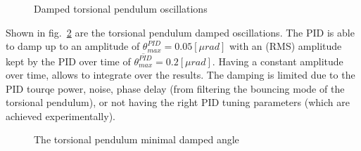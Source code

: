 \documentclass[\main/master.tex]{subfiles}
\begin{document}
\begin{figure}[htbp]
	\centering
	\caption[Damped torsional pendulum oscillations]{Damped torsional pendulum oscillations}
	\label{fig:measured oscillation angle}
\end{figure}
\FloatBarrier
\par\noindent
Shown in fig.~\ref{fig:measured oscillation angle 1} are the torsional pendulum damped oscillations. The PID is able to damp up to an amplitude of $\theta_{max}^{PID}= 0.05[\mu rad]$ with an (RMS) amplitude kept by the PID over time of $\overline{\theta_{max}^{PID}} = 0.2 [\mu rad]$. Having a constant amplitude over time, allows to integrate over the results. The damping is limited due to the PID tourqe power, noise, phase delay (from filtering the bouncing mode of the torsional pendulum), or not having the right PID tuning parameters (which are achieved experimentally).
\begin{figure}[htbp]
	\centering
	\caption[The torsional pendulum minimal damped angle]{The torsional pendulum minimal damped angle}
	\label{fig:measured oscillation angle 1}
\end{figure}
\FloatBarrier
\end{document}
